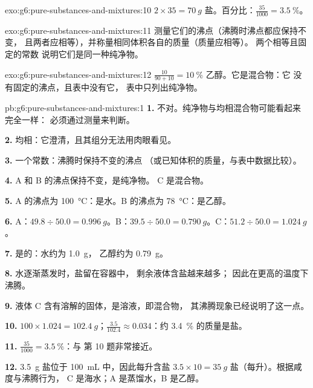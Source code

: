 \begin{solution}{exo:g6:pure-substances-and-mixtures:10}
$2 \times 35 = \qty{70}{g}$ 盐。百分比：$\frac{35}{1000} =
\qty{3.5}{\percent}$。
\end{solution}

\begin{solution}{exo:g6:pure-substances-and-mixtures:11}
测量它们的沸点（沸腾时沸点都应保持不变，
且两者应相等），并称量相同体积各自的质量（质量应相等）。
两个相等且固定的常数
说明它们是同一种纯净物。
\end{solution}

\begin{solution}{exo:g6:pure-substances-and-mixtures:12}
$\frac{10}{90 + 10} = \qty{10}{\percent}$ 乙醇。它是混合物：它
没有固定的沸点，且表中没有它，
表中只列出纯净物。
\end{solution}

\begin{solution}{pb:g6:pure-substances-and-mixtures:1}
\textbf{1.} 不对。纯净物与均相混合物可能看起来完全一样：
必须通过测量来判断。

\textbf{2.} 均相：它澄清，且其组分无法用肉眼看见。

\textbf{3.} 一个常数：沸腾时保持不变的沸点
（或已知体积的质量，与表中数据比较）。

\textbf{4.} A 和 B 的沸点保持不变，是纯净物。
C 是混合物。

\textbf{5.} A 的沸点为 \qty{100}{\celsius}：是水。B 的沸点为
\qty{78}{\celsius}：是乙醇。

\textbf{6.} A：$49.8 \div 50.0 = \qty{0.996}{g}$。B：$39.5 \div 50.0 =
\qty{0.790}{g}$。C：$51.2 \div 50.0 = \qty{1.024}{g}$。

\textbf{7.} 是的：水约为 \qty{1.0}{g}，
乙醇约为 \qty{0.79}{g}。

\textbf{8.} 水逐渐蒸发时，盐留在容器中，
剩余液体含盐越来越多；
因此在更高的温度下沸腾。

\textbf{9.} 液体 C 含有溶解的固体，是溶液，即混合物，
其沸腾现象已经说明了这一点。

\textbf{10.} $100 \times 1.024 = \qty{102.4}{g}$；$\frac{3.5}{102.4}
\approx 0.034$：约 \qty{3.4}{\percent} 的质量是盐。

\textbf{11.} $\frac{35}{1000} = \qty{3.5}{\percent}$：与
第 10 题非常接近。

\textbf{12.} \qty{3.5}{g} 盐位于 \qty{100}{mL} 中，因此每升含盐 $3.5 \times 10 =
\qty{35}{g}$ 盐（每升）。根据咸度与沸腾行为，
C 是海水；A 是蒸馏水，B 是乙醇。
\end{solution}
